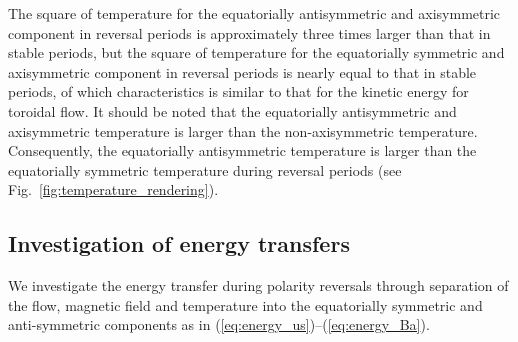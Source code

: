 The square of temperature for the equatorially antisymmetric and axisymmetric component in reversal periods is approximately three times larger than that in stable periods, but the square of temperature for the equatorially symmetric and axisymmetric component in reversal periods is nearly equal to that in stable periods, of which characteristics is similar to that for the kinetic energy for toroidal flow.
It should be noted that the equatorially antisymmetric and axisymmetric temperature is larger than the non-axisymmetric temperature.
Consequently, the equatorially antisymmetric temperature is larger than the equatorially symmetric temperature during reversal periods (see Fig.~\ref{fig:temperature_rendering}). 



\subsection{Investigation of energy transfers}
\label{sec:energy_transfer}

We investigate the energy transfer during polarity reversals through separation of the flow, magnetic field and temperature into the equatorially symmetric and anti-symmetric components as in (\ref{eq:energy_us})--(\ref{eq:energy_Ba}).

